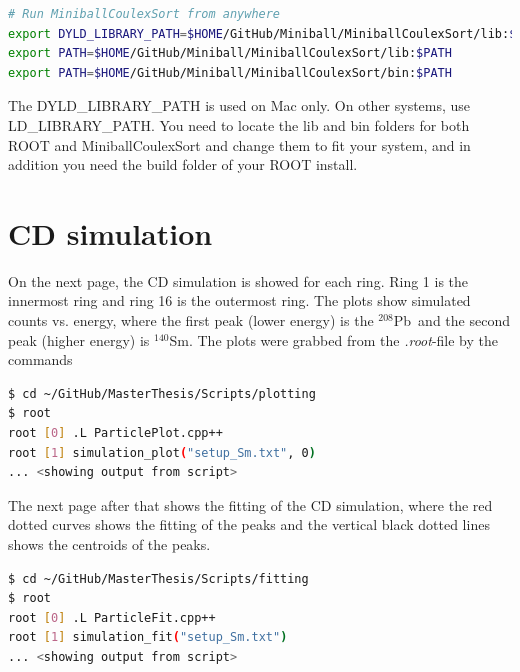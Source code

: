 \documentclass[twoside,english]{uiofysmaster/uiofysmaster}
\newcommand{\Sm}{$^{140}$Sm} %
\newcommand{\Pb}{$^{208}$Pb}
\begin{document}
\begin{appendices}
\begin{lstlisting}[language=sh]
# Run MiniballCoulexSort from anywhere
export DYLD_LIBRARY_PATH=$HOME/GitHub/Miniball/MiniballCoulexSort/lib:$DYLD_LIBRARY_PATH
export PATH=$HOME/GitHub/Miniball/MiniballCoulexSort/lib:$PATH
export PATH=$HOME/GitHub/Miniball/MiniballCoulexSort/bin:$PATH
\end{lstlisting}
The DYLD\_LIBRARY\_PATH is used on Mac only. On other systems, use \newline LD\_LIBRARY\_PATH. You need to locate the lib and bin folders for both ROOT and MiniballCoulexSort and change them to fit your system, and in addition you need the build folder of your ROOT install.


\chapter{CD simulation}\label{ch:cd_sim}
On the next page, the CD simulation is showed for each ring. Ring 1 is the innermost ring and ring 16 is the outermost ring. The plots show simulated counts vs. energy, where the first peak (lower energy) is the \Pb\ and the second peak (higher energy) is \Sm. The plots were grabbed from the \textit{.root}-file by the commands

\begin{lstlisting}[language=sh]
$ cd ~/GitHub/MasterThesis/Scripts/plotting
$ root
root [0] .L ParticlePlot.cpp++
root [1] simulation_plot("setup_Sm.txt", 0)
... <showing output from script>
\end{lstlisting}

The next page after that shows the fitting of the CD simulation, where the red dotted curves shows the fitting of the peaks and the vertical black dotted lines shows the centroids of the peaks.

\begin{lstlisting}[language=sh]
$ cd ~/GitHub/MasterThesis/Scripts/fitting
$ root
root [0] .L ParticleFit.cpp++
root [1] simulation_fit("setup_Sm.txt")
... <showing output from script>
\end{lstlisting}







\end{appendices}



%


\end{document}

